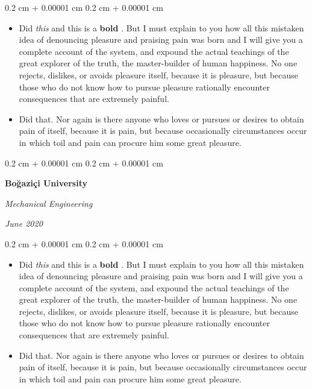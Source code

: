 \documentclass[10pt, letterpaper]{article}
\newenvironment{highlights}{
    \begin{itemize}[
        topsep=0.10 cm,
        parsep=0.10 cm,
        partopsep=0pt,
        itemsep=0pt,
        leftmargin=0.4 cm + 10pt
    ]
}{
    \end{itemize}
} %
\newenvironment{onecolentry}{
    \begin{adjustwidth}{
        0.2 cm + 0.00001 cm
    }{
        0.2 cm + 0.00001 cm
    }
}{
    \end{adjustwidth}
} %
\newenvironment{twocolentry}[2][]{
    \onecolentry
    \def\secondColumn{#2}
    \setcolumnwidth{\fill, 4.5 cm}
    \begin{paracol}{2}
}{
    \switchcolumn \raggedleft \secondColumn
    \end{paracol}
    \endonecolentry
} %
\let\hrefWithoutArrow\href
\renewcommand{\href}[2]{\hrefWithoutArrow{#1}{\ifthenelse{\equal{#2}{}}{ }{#2 }\raisebox{.15ex}{\footnotesize \faExternalLink*}}}
\begin{document}
        \vspace{0.10 cm}
        \begin{onecolentry}
            \begin{highlights}
                \item Did \textit{this} and this is a \textbf{bold} \href{https://example.com}{link}. But I must explain to you how all this mistaken idea of denouncing pleasure and praising pain was born and I will give you a complete account of the system, and expound the actual teachings of the great explorer of the truth, the master-builder of human happiness. No one rejects, dislikes, or avoids pleasure itself, because it is pleasure, but because those who do not know how to pursue pleasure rationally encounter consequences that are extremely painful.
                \item Did that. Nor again is there anyone who loves or pursues or desires to obtain pain of itself, because it is pain, but because occasionally circumstances occur in which toil and pain can procure him some great pleasure.
            \end{highlights}
        \end{onecolentry}


        \vspace{0.2 cm}

        \begin{twocolentry}{
            
            
        \textit{June 2020}}
            \textbf{Boğaziçi University}

            \textit{Mechanical Engineering}
        \end{twocolentry}

        \vspace{0.10 cm}
        \begin{onecolentry}
            \begin{highlights}
                \item Did \textit{this} and this is a \textbf{bold} \href{https://example.com}{link}. But I must explain to you how all this mistaken idea of denouncing pleasure and praising pain was born and I will give you a complete account of the system, and expound the actual teachings of the great explorer of the truth, the master-builder of human happiness. No one rejects, dislikes, or avoids pleasure itself, because it is pleasure, but because those who do not know how to pursue pleasure rationally encounter consequences that are extremely painful.
                \item Did that. Nor again is there anyone who loves or pursues or desires to obtain pain of itself, because it is pain, but because occasionally circumstances occur in which toil and pain can procure him some great pleasure.
            \end{highlights}
        \end{onecolentry}
\end{document}
